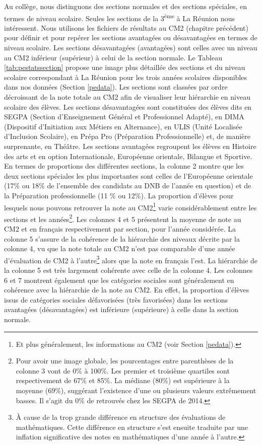 \documentclass[
]{book}
\begin{document}
\quad Au collège, nous distinguons des sections normales et des sections spéciales, en termes de niveau scolaire. Seules les sections de la 3\textsuperscript{ème} à La Réunion nous intéressent. Nous utilisons les fichiers de résultats au CM2 (chapitre précédent) pour définir et pour repérer les sections avantagées ou désavantagées en termes de niveau scolaire. Les sections désavantagées (avantagées) sont celles avec un niveau au CM2 inférieur (supérieur) à celui de la section normale.
Le Tableau \ref{tab:pestatssection} propose une image plus détaillée des sections et du niveau scolaire correspondant à La Réunion pour les trois années scolaires disponibles dans nos données (Section \ref{pedata}). Les sections sont classées par ordre décroissant de la note totale au CM2 afin de visualiser leur hiérarchie en niveau scolaire des élèves.
Les sections désavantagées sont constituées des élèves dits en SEGPA (Section d'Enseignement Général et Professionnel Adapté), en DIMA (Dispositif d'Initiation aux Métiers en Alternance), en ULIS (Unité Localisée d'Inclusion Scolaire), en Prépa Pro (Préparation Professionnelle) et, de manière surprenante, en Théâtre. Les sections avantagées regroupent les élèves en Histoire des arts et en option Internationale, Européenne orientale, Bilangue et Sportive.\\
En termes de proportions des différentes sections, la colonne 2 montre que les deux sections spéciales les plus importantes sont celles de l'Européenne orientale (17\% ou 18\% de l'ensemble des candidats au DNB de l'année en question) et de la Préparation professionnelle (11 \% ou 12\%). La proportion d'élèves pour lesquels nous pouvons retrouver la note au CM2\footnote{Et plus généralement, les informations au CM2 (voir Section \ref{pedata}).} varie considérablement entre les sections et les années\footnote{Pour avoir une image globale, les pourcentages entre parenthèses de la colonne 3 vont de 0\% à 100\%. Les premier et troisième quartiles sont respectivement de 67\% et 85\%. La médiane (80\%) est supérieure à la moyenne (69\%), suggérant l'existence d'une ou plusieurs valeurs extrêmement basses. Il s'agit du 0\% de retrouvés chez les SEGPA de 2014.}. Les colonnes 4 et 5 présentent la moyenne de note au CM2 et en français respectivement par section, pour l'année considérée. La colonne 5 s'assure de la cohérence de la hiérarchie des niveaux décrite par la colonne 4, vu que la note totale au CM2 n'est pas comparable d'une année d'évaluation de CM2 à l'autre\footnote{À cause de la trop grande différence en structure des évaluations de mathématiques. Cette différence en structure s'est ensuite traduite par une inflation significative des notes en mathématiques d'une année à l'autre.} alors que la note en français l'est. La hiérarchie de la colonne 5 est très largement cohérente avec celle de la colonne 4. Les colonnes 6 et 7 montrent également que les catégories sociales sont généralement en cohérence avec la hiérarchie de la note au CM2. En effet, la proportion d'élèves issus de catégories sociales défavorisées (très favorisées) dans les sections avantagées (désavantagées) est inférieure (supérieure) à celle dans la section normale.
\end{document}
